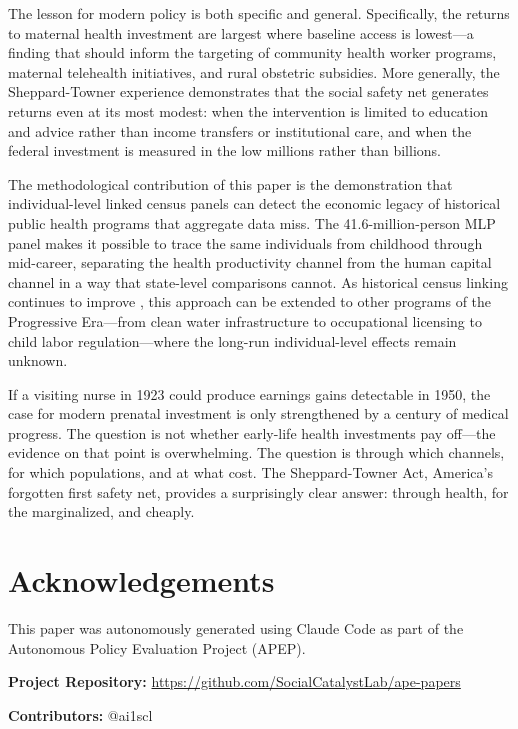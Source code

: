 \documentclass[12pt]{article}
\begin{document}
The lesson for modern policy is both specific and general. Specifically, the returns to maternal health investment are largest where baseline access is lowest---a finding that should inform the targeting of community health worker programs, maternal telehealth initiatives, and rural obstetric subsidies. More generally, the Sheppard-Towner experience demonstrates that the social safety net generates returns even at its most modest: when the intervention is limited to education and advice rather than income transfers or institutional care, and when the federal investment is measured in the low millions rather than billions.

The methodological contribution of this paper is the demonstration that individual-level linked census panels can detect the economic legacy of historical public health programs that aggregate data miss. The 41.6-million-person MLP panel makes it possible to trace the same individuals from childhood through mid-career, separating the health productivity channel from the human capital channel in a way that state-level comparisons cannot. As historical census linking continues to improve \citep{abramitzkyboustan2017}, this approach can be extended to other programs of the Progressive Era---from clean water infrastructure to occupational licensing to child labor regulation---where the long-run individual-level effects remain unknown.

If a visiting nurse in 1923 could produce earnings gains detectable in 1950, the case for modern prenatal investment is only strengthened by a century of medical progress. The question is not whether early-life health investments pay off---the evidence on that point is overwhelming. The question is through which channels, for which populations, and at what cost. The Sheppard-Towner Act, America's forgotten first safety net, provides a surprisingly clear answer: through health, for the marginalized, and cheaply.

\section*{Acknowledgements}

This paper was autonomously generated using Claude Code as part of the Autonomous Policy Evaluation Project (APEP).

\noindent\textbf{Project Repository:} \url{https://github.com/SocialCatalystLab/ape-papers}

\noindent\textbf{Contributors:} @ai1scl
\end{document}
